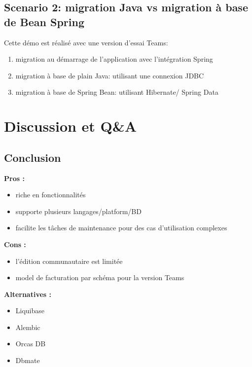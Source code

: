 \documentclass[slidestop,compress,11pt,xcolor=dvipsnames,french]{beamer}
\begin{document}
\subsection*{Scenario 2: migration Java vs migration à base de Bean Spring}
\begin{frame}
Cette démo est réalisé avec une version d'essai Teams: 
\begin{enumerate}
 \item migration au démarrage de l'application avec l'intégration Spring
 \item migration à base de plain Java: utilisant une connexion JDBC
 \item migration à base de Spring Bean: utilisant Hibernate/ Spring Data
\end{enumerate}
\end{frame}

\section[Discussion]{Discussion et Q\&A}
\subsection*{Conclusion }
\begin{frame}
\textbf {Pros : \\}
\begin{itemize}
 \item riche en fonctionnalités 
 \item supporte plusieurs langages/platform/BD
 \item facilite les tâches de maintenance pour des cas d'utilisation complexes
\end{itemize}
\textbf {Cons : \\}
\begin{itemize}
 \item l'édition communautaire est limitée 
 \item model de facturation par schéma pour la version Teams
\end{itemize}
\textbf {Alternatives : \\}
\begin{itemize}
 \item Liquibase 
 \item Alembic
 \item Orcas DB
 \item Dbmate
\end{itemize}
\end{frame}
\end{document}
